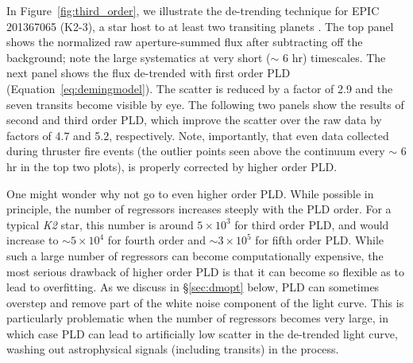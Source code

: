 \documentclass[]{emulateapj}
\begin{document}
In Figure~\ref{fig:third_order}, we illustrate the de-trending technique for EPIC
201367065 (K2-3), a star host to at least two transiting planets \citep{CRO15}. The top
panel shows the normalized raw aperture-summed flux after subtracting off the 
background; note the large systematics at very short ($\sim$ 6 hr) timescales. The
next panel shows the flux de-trended with first order PLD (Equation~\ref{eq:demingmodel}).
The scatter is reduced by a factor of 2.9 and the
seven transits become visible by eye. The following two panels show the results of
second and third order PLD, which improve the scatter over the raw data by factors of 
4.7 and 5.2, respectively. Note, importantly, that even data collected during thruster
fire events (the outlier points seen above the continuum every $\sim$ 6 hr in the top 
two plots), is properly corrected by higher order PLD.

One might wonder why not go to even higher order PLD. While possible in principle,
the number of regressors increases steeply with the PLD order. For a typical \emph{K2} star, this number is
around $5\times 10^3$ for third order PLD, and would increase to $\sim5\times 10^4$ for
fourth order and $\sim3\times 10^5$ for fifth order PLD.
%
%
While such a large number of regressors can become computationally expensive, the 
most serious drawback of higher order PLD is that it can become so flexible as to
lead to overfitting. As we discuss in \S\ref{sec:dmopt} below,
PLD can sometimes overstep and remove part of the white noise component of the 
light curve. This is particularly problematic when the number of regressors becomes very large,
in which case PLD can lead to artificially low scatter in the de-trended light curve,
washing out astrophysical signals (including transits) in the process.
\end{document}

